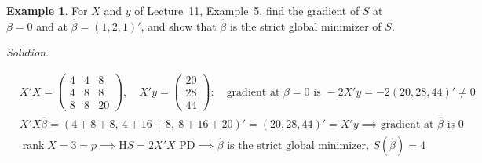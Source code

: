 \documentclass[12pt]{article}
\DeclareMathOperator{\rank}{rank}
\theoremstyle{definition}
\newtheorem{example}[theorem]{Example}
\newcommand{\lec}[1]{Lecture~#1}
\newcommand{\boardtop}{\vspace*{-\abovedisplayskip}}
\begin{document}
\begin{example}\label{b16.42}
For \(X\) and \(y\) of \lec{11}, Example~5, find the gradient of \(S\) at \(\beta=0\) and at \(\hat\beta=(1,2,1)'\),
and show that \(\hat\beta\) is the strict global minimizer of \(S\).
\end{example}
\textit{Solution.}
\begin{board}[Theorem~\ref{b16.41}(a),(c): the gradient is \(2X'X\beta-2X'y\); \(X'X\), \(X'y\), \(\rank X=3\) and
\(S(\hat\beta)=4\) from \lec{11}, Example~5:]
\boardtop
\begin{align*}
&X'X=\begin{pmatrix}4&4&8\\4&8&8\\8&8&20\end{pmatrix},\quad X'y=\begin{pmatrix}20\\28\\44\end{pmatrix}\colon\quad
\text{gradient at }\beta=0\text{ is }-2X'y=-2(20,28,44)'\ne0\\
&X'X\hat\beta=(4+8+8,\ 4+16+8,\ 8+16+20)'=(20,28,44)'=X'y\implies\text{gradient at }\hat\beta\text{ is }0\\
&\rank X=3=p\implies\mathrm HS=2X'X\text{ PD}\implies\hat\beta\text{ is the strict global minimizer},\ S(\hat\beta)=4
\end{align*}
\end{board}
\end{document}

